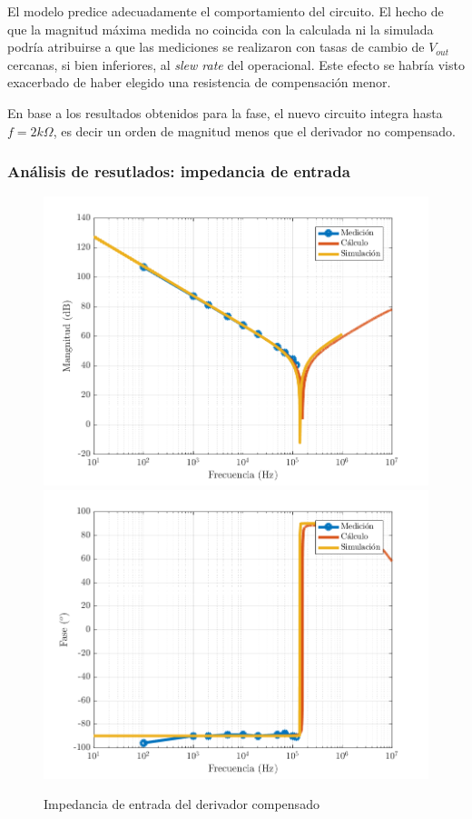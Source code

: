 \documentclass[../../main.tex]{subfiles}
\begin{document}
El modelo predice adecuadamente el comportamiento del circuito. El hecho de que la magnitud m\'axima medida no coincida con la calculada ni la simulada podr\'ia atribuirse a que las mediciones se realizaron con tasas de cambio de $V_{out}$ cercanas, si bien inferiores, al \textit{slew rate} del operacional. Este efecto se habr\'ia visto exacerbado de haber elegido una resistencia de compensaci\'on menor.\par

En base a los resultados obtenidos para la fase, el nuevo circuito integra hasta $f = 2k\Omega$, es decir un orden de magnitud menos que el derivador no compensado.


\subsubsection{An\'alisis de resutlados: impedancia de entrada}

\begin{figure}  [H]
	\centering
	\label{fig:dcomp-zin}
	\includegraphics[scale=0.7]{fotos/tc_tp2_ej4_d_Zin_mag.png}
	\includegraphics[scale=0.7]{fotos/tc_tp2_ej4_d_Zin_fase.png}
	\caption{Impedancia de entrada del derivador compensado}
\end{figure}
\end{document}

